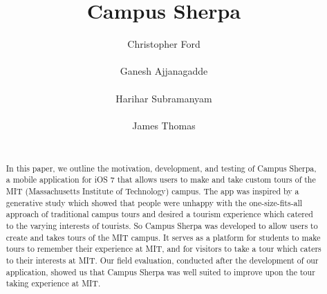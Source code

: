 \documentclass{sigchi}
\begin{document}
\nocite{*}
\title{Campus Sherpa}

\author{
  \alignauthor Christopher Ford\\
    \\
  \alignauthor Ganesh Ajjanagadde\\
    \\  
  \alignauthor Harihar Subramanyam\\
    \\
   \alignauthor James Thomas\\
    \\
}

\maketitle

\begin{abstract}
In this paper, we outline the motivation, development, and testing of Campus Sherpa, a mobile application for iOS 7 that allows users to make and take custom tours of the MIT (Massachusetts Institute of Technology) campus. The app was inspired by a generative study which showed that people were unhappy with the one-size-fits-all approach of traditional campus tours and desired a tourism experience which catered to the varying interests of tourists. So Campus Sherpa was developed to allow users to create and takes tours of the MIT campus. It serves as a platform for students to make tours to remember their experience at MIT, and for visitors to take a tour which caters to their interests at MIT. Our field evaluation, conducted after the development of our application, showed us that Campus Sherpa was well suited to improve upon the tour taking experience at MIT. 
\end{abstract}


%
%
\end{document}
